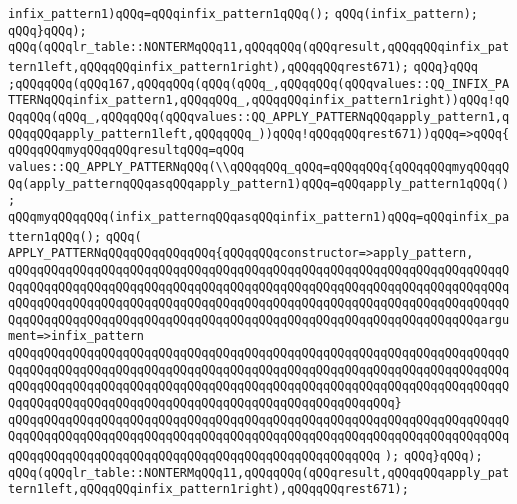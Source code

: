 \verb|infix_pattern1)qQQq=qQQqinfix_pattern1qQQq();|\newline
\verb|qQQq(infix_pattern);|\newline
\verb|qQQq}qQQq);|\newline
\verb|qQQq(qQQqlr_table::NONTERMqQQq11,qQQqqQQq(qQQqresult,qQQqqQQqinfix_pattern1left,qQQqqQQqinfix_pattern1right),qQQqqQQqrest671);|\newline
\verb|qQQq}qQQq|\newline
\verb|;qQQqqQQq(qQQq167,qQQqqQQq(qQQq(qQQq_,qQQqqQQq(qQQqvalues::QQ_INFIX_PATTERNqQQqinfix_pattern1,qQQqqQQq_,qQQqqQQqinfix_pattern1right))qQQq!qQQqqQQq(qQQq_,qQQqqQQq(qQQqvalues::QQ_APPLY_PATTERNqQQqapply_pattern1,qQQqqQQqapply_pattern1left,qQQqqQQq_))qQQq!qQQqqQQqrest671))qQQq=>qQQq{qQQqqQQqmyqQQqqQQqresultqQQq=qQQq|\newline
\verb|values::QQ_APPLY_PATTERNqQQq(\\qQQqqQQq_qQQq=qQQqqQQq{qQQqqQQqmyqQQqqQQq(apply_patternqQQqasqQQqapply_pattern1)qQQq=qQQqapply_pattern1qQQq();|\newline
\verb|qQQqmyqQQqqQQq(infix_patternqQQqasqQQqinfix_pattern1)qQQq=qQQqinfix_pattern1qQQq();|\newline
\verb|qQQq(|\newline
\verb|APPLY_PATTERNqQQqqQQqqQQqqQQq{qQQqqQQqconstructor=>apply_pattern,|\newline
\verb|qQQqqQQqqQQqqQQqqQQqqQQqqQQqqQQqqQQqqQQqqQQqqQQqqQQqqQQqqQQqqQQqqQQqqQQqqQQqqQQqqQQqqQQqqQQqqQQqqQQqqQQqqQQqqQQqqQQqqQQqqQQqqQQqqQQqqQQqqQQqqQQqqQQqqQQqqQQqqQQqqQQqqQQqqQQqqQQqqQQqqQQqqQQqqQQqqQQqqQQqqQQqqQQqqQQqqQQqqQQqqQQqqQQqqQQqqQQqqQQqqQQqqQQqqQQqqQQqqQQqqQQqqQQqqQQqqQQqargument=>infix_pattern|\newline
\verb|qQQqqQQqqQQqqQQqqQQqqQQqqQQqqQQqqQQqqQQqqQQqqQQqqQQqqQQqqQQqqQQqqQQqqQQqqQQqqQQqqQQqqQQqqQQqqQQqqQQqqQQqqQQqqQQqqQQqqQQqqQQqqQQqqQQqqQQqqQQqqQQqqQQqqQQqqQQqqQQqqQQqqQQqqQQqqQQqqQQqqQQqqQQqqQQqqQQqqQQqqQQqqQQqqQQqqQQqqQQqqQQqqQQqqQQqqQQqqQQqqQQqqQQqqQQqqQQqqQQqqQQq}|\newline
\verb|qQQqqQQqqQQqqQQqqQQqqQQqqQQqqQQqqQQqqQQqqQQqqQQqqQQqqQQqqQQqqQQqqQQqqQQqqQQqqQQqqQQqqQQqqQQqqQQqqQQqqQQqqQQqqQQqqQQqqQQqqQQqqQQqqQQqqQQqqQQqqQQqqQQqqQQqqQQqqQQqqQQqqQQqqQQqqQQqqQQqqQQqqQQqqQQq|\newline
\verb|);|\newline
\verb|qQQq}qQQq);|\newline
\verb|qQQq(qQQqlr_table::NONTERMqQQq11,qQQqqQQq(qQQqresult,qQQqqQQqapply_pattern1left,qQQqqQQqinfix_pattern1right),qQQqqQQqrest671);|\newline
